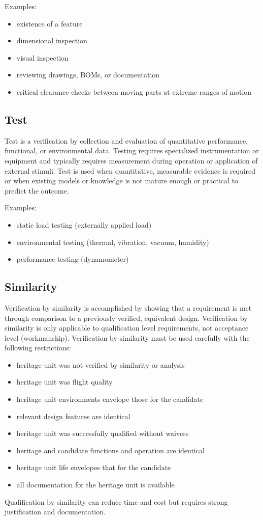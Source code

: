 \documentclass[12pt]{article}
\begin{document}
Examples: 
\begin{itemize}
\item existence of a feature
\item dimensional inspection
\item visual inspection
\item reviewing drawings, BOMs, or documentation
\item critical clearance checks between moving parts at extreme ranges of motion
\end{itemize}

\subsection{Test}
Test is a verification by collection and evaluation of quantitative performance, functional, or environmental data. 
Testing requires specialized instrumentation or equipment and typically requires measurement during operation or application of external stimuli. 
Test is used when quantitative, measurable evidence is required or when existing models or knowledge is not mature enough or practical to predict the outcome. 

Examples: 
\begin{itemize}
\item static load testing (externally applied load)
\item environmental testing (thermal, vibration, vacuum, humidity) 
\item performance testing (dynamometer)
\end{itemize}

\subsection{Similarity}
Verification by similarity is accomplished by showing that a requirement is met through comparison to a previously verified, equivalent design. 
Verification by similarity is only applicable to qualification level requirements, not acceptance level (workmanship). Verification by similarity must be used carefully with the following restrictions:
\begin{itemize}
\item heritage unit was not verified by similarity or analysis
\item heritage unit was flight quality
\item heritage unit environments envelope those for the candidate
\item relevant design features are identical
\item heritage unit was successfully qualified without waivers
\item heritage and candidate functions and operation are identical
\item heritage unit life envelopes that for the candidate
\item all documentation for the heritage unit is available
\end{itemize}
Qualification by similarity can reduce time and cost but requires strong justification and documentation.
\end{document}
